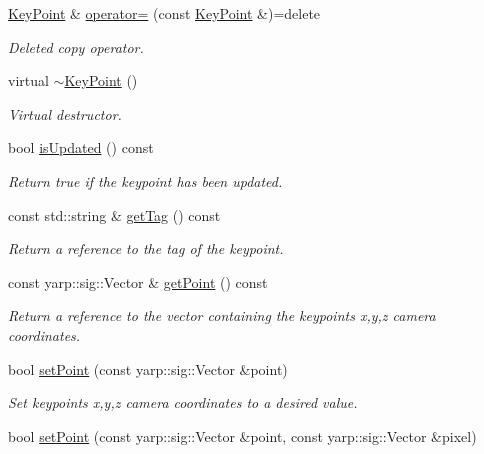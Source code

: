 \begin{DoxyCompactItemize}
\hyperlink{classassistive__rehab_1_1KeyPoint}{Key\+Point} \& \hyperlink{classassistive__rehab_1_1KeyPoint_aecdf117e438bedb51734c7d2730e6d61}{operator=} (const \hyperlink{classassistive__rehab_1_1KeyPoint}{Key\+Point} \&)=delete
\begin{DoxyCompactList}\small\item\em Deleted copy operator. \end{DoxyCompactList}\item 
\mbox{\label{classassistive__rehab_1_1KeyPoint_a5c959f932cbdc1cd4f326aef56a8e66b}} 
virtual \hyperlink{classassistive__rehab_1_1KeyPoint_a5c959f932cbdc1cd4f326aef56a8e66b}{$\sim$\+Key\+Point} ()
\begin{DoxyCompactList}\small\item\em Virtual destructor. \end{DoxyCompactList}\item 
bool \hyperlink{classassistive__rehab_1_1KeyPoint_ab1c339fe8a6dd281534d54bb0fdb3c50}{is\+Updated} () const
\begin{DoxyCompactList}\small\item\em Return true if the keypoint has been updated. \end{DoxyCompactList}\item 
const std\+::string \& \hyperlink{classassistive__rehab_1_1KeyPoint_ace24db46297c42bee32acd87d7450dcd}{get\+Tag} () const
\begin{DoxyCompactList}\small\item\em Return a reference to the tag of the keypoint. \end{DoxyCompactList}\item 
const yarp\+::sig\+::\+Vector \& \hyperlink{classassistive__rehab_1_1KeyPoint_a4d68e0824d66f6f0db6dbc176eec3930}{get\+Point} () const
\begin{DoxyCompactList}\small\item\em Return a reference to the vector containing the keypoint\textquotesingle{}s x,y,z camera coordinates. \end{DoxyCompactList}\item 
bool \hyperlink{classassistive__rehab_1_1KeyPoint_a6430d1d6b7704a85462de39b6962e48b}{set\+Point} (const yarp\+::sig\+::\+Vector \&point)
\begin{DoxyCompactList}\small\item\em Set keypoint\textquotesingle{}s x,y,z camera coordinates to a desired value. \end{DoxyCompactList}\item 
bool \hyperlink{classassistive__rehab_1_1KeyPoint_adcb8950f2c32cdf93c3d4b2f6a9f1a70}{set\+Point} (const yarp\+::sig\+::\+Vector \&point, const yarp\+::sig\+::\+Vector \&pixel)

\end{DoxyCompactItemize}
